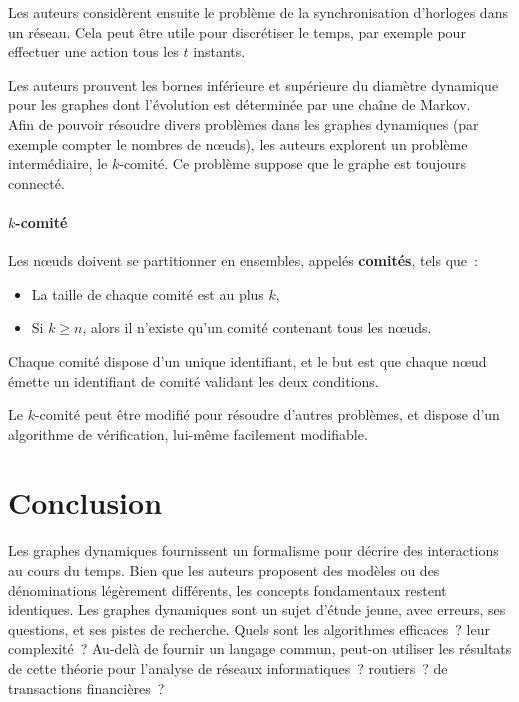 \documentclass[12pt,a4paper]{article}
\begin{document}
Les auteurs considèrent ensuite le problème de la synchronisation
d'horloges dans un réseau. Cela peut être utile pour discrétiser le
temps, par exemple pour effectuer une action tous les \(t\) instants.

Les auteurs prouvent les bornes inférieure et supérieure du diamètre
dynamique pour les graphes dont l'évolution est déterminée
par une chaîne de Markov.\\

Afin de pouvoir résoudre divers problèmes dans les graphes dynamiques
(par exemple compter le nombres de nœuds), les auteurs explorent un
problème intermédiaire, le \(k\)-comité. Ce problème suppose que le
graphe est toujours connecté.

\paragraph{\(k\)-comité}
Les nœuds doivent se partitionner en ensembles, appelés
\textbf{comités}, tels que~:
\begin{itemize}
\item La taille de chaque comité est au plus \(k\),
\item Si \(k \geq n\), alors il n'existe qu'un comité contenant tous
  les nœuds.
\end{itemize}
Chaque comité dispose d'un unique identifiant, et le but est que
chaque nœud émette un identifiant de comité validant les deux
conditions.

Le \(k\)-comité peut être modifié pour résoudre d'autres problèmes, et
dispose d'un algorithme de vérification, lui-même facilement
modifiable.

\section{Conclusion}
Les graphes dynamiques fournissent un formalisme pour décrire des
interactions au cours du temps. Bien que les auteurs proposent des
modèles ou des dénominations légèrement différents, les concepts
fondamentaux restent identiques. Les graphes dynamiques sont un sujet
d'étude jeune, avec erreurs, ses questions, et ses pistes de
recherche. Quels sont les algorithmes efficaces~? leur complexité~?
Au-delà de fournir un langage commun, peut-on utiliser les résultats
de cette théorie pour l'analyse de réseaux informatiques~? routiers~?
de transactions financières~?

\pagebreak
\printbibliography{}
\end{document}
